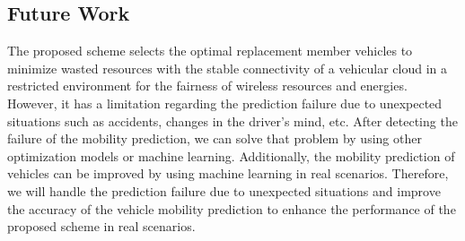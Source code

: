 \documentclass[electronics,aricle,accept,pdftex,moreauthors]{Definitions/mdpi}
\begin{document}
\subsection{Future Work}
The proposed scheme selects the optimal replacement member vehicles to minimize wasted resources with the stable connectivity of a vehicular cloud in a restricted environment for the fairness of wireless resources and energies.
However, it has a limitation regarding the prediction failure due to unexpected situations such as accidents, changes in the driver's mind, etc.
After detecting the failure of the mobility prediction, we can solve that problem by using other optimization models or machine learning.
Additionally, the mobility prediction of vehicles can be improved by using machine learning in real scenarios.
Therefore, we will handle the prediction failure due to unexpected situations and improve the accuracy of the vehicle mobility prediction to enhance the performance of the proposed scheme in real scenarios.



\vspace{6pt}
\end{document}

